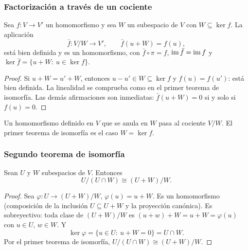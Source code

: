 \begin{frame}
    \frametitle{Factorización a través de un cociente}

    \begin{proposition}
        Sea $f\colon V\to V'$ un homomorfismo y sea $W$ un subespacio de
        $V$ con $W\subseteq\ker f$. La aplicación
        \[
            \bar f\colon V/W\longrightarrow V',\qquad
            \bar f(u+W)=f(u),
        \]
        está bien definida y es un homomorfismo, con
        $\bar f\circ\pi=f$, $\operatorname{im}\bar f=\operatorname{im} f$ y
        $\ker\bar f=\{u+W:\ u\in\ker f\}$.
    \end{proposition}

    \begin{proof}
        Si $u+W=u'+W$, entonces $u-u'\in W\subseteq\ker f$ y
        $f(u)=f(u')$: está bien definida. La linealidad se comprueba como
        en el primer teorema de isomorfía. Las demás afirmaciones son
        inmediatas: $\bar f(u+W)=0$ si y solo si $f(u)=0$.
    \end{proof}

    \medskip

    Un homomorfismo definido en $V$ que se anula en $W$ \alert{pasa al
    cociente} $V/W$. El primer teorema de isomorfía es el caso
    $W=\ker f$.
\end{frame}


\begin{frame}
    \frametitle{Segundo teorema de isomorfía}

    \begin{theorem}
        Sean $U$ y $W$ subespacios de $V$. Entonces
        \[
            U/(U\cap W)\cong(U+W)/W.
        \]
    \end{theorem}

    \begin{proof}
        Sea $\varphi\colon U\to(U+W)/W$, $\varphi(u)=u+W$. Es un
        homomorfismo (composición de la inclusión $U\subseteq U+W$ y la
        proyección canónica). Es sobreyectivo: toda clase de $(U+W)/W$ es
        $(u+w)+W=u+W=\varphi(u)$ con $u\in U$, $w\in W$. Y
        \[
            \ker\varphi=\{u\in U:\ u+W=0\}=U\cap W.
        \]
        Por el primer teorema de isomorfía, $U/(U\cap W)\cong(U+W)/W$.
    \end{proof}
\end{frame}


